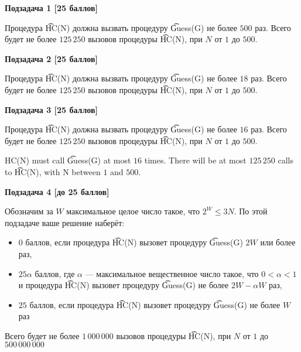 {\bf Подзадача 1 [25 баллов]}

Процедура \t{HC(N)} должна вызвать процедуру \t{Guess(G)} не более $500$ раз. Всего будет не более $125\,250$ вызовов процедуры \t{HC(N)}, при $N$ от $1$ до $500$.

{\bf Подзадача 2 [25 баллов]}

Процедура \t{HC(N)} должна вызвать процедуру \t{Guess(G)} не более $18$ раз. Всего будет не более $125\,250$ вызовов процедуры \t{HC(N)}, при $N$ от $1$ до $500$.

{\bf Подзадача 3 [25 баллов]}

Процедура \t{HC(N)} должна вызвать процедуру \t{Guess(G)} не более $16$ раз. Всего будет не более $125\,250$ вызовов процедуры \t{HC(N)}, при $N$ от $1$ до $500$.

HC(N) must call \t{Guess(G)} at most $16$ times. There will be at most $125\,250$ calls to \t{HC(N)}, with N between $1$ and $500$.

{\bf Подзадача 4 [до 25 баллов]}

Обозначим за $W$ максимальное целое число такое, что $2^W \le 3 N$. По этой подзадаче ваше решение наберёт:

\begin{itemize}
\item $0$ баллов, если процедура \t{HC(N)} вызовет процедуру \t{Guess(G)} $2W$ или более раз, 
\item $25\alpha$ баллов, где $\alpha$ --- максимальное вещественное число такое, что $0 < \alpha < 1$ и процедура \t{HC(N)} вызовет процедуру \t{Guess(G)} не более $2W - \alpha W$ раз, 
\item $25$ баллов, если процедура \t{HC(N)} вызовет процедуру \t{Guess(G)} не более $W$ раз
\end{itemize}

Всего будет не более $1\,000\,000$ вызовов процедуры \t{HC(N)}, при $N$ от $1$ до $500\,000\,000$
